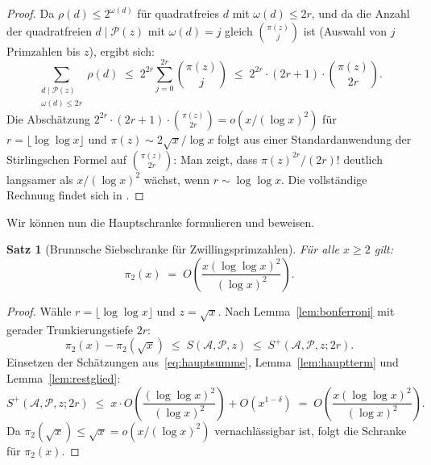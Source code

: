 \documentclass[12pt,a4paper]{amsart}
\newtheorem{theorem}{Satz}[section]
\theoremstyle{definition}
\begin{document}
\begin{proof}
  Da $\rho(d) \leq 2^{\omega(d)}$ für quadratfreies $d$ mit $\omega(d) \leq 2r$,
  und da die Anzahl der quadratfreien $d \mid \mathcal{P}(z)$ mit $\omega(d) = j$
  gleich $\binom{\pi(z)}{j}$ ist (Auswahl von $j$ Primzahlen bis $z$), ergibt sich:
  \[
    \sum_{\substack{d \mid \mathcal{P}(z)\\ \omega(d)\leq 2r}} \rho(d)
    \;\leq\; 2^{2r} \sum_{j=0}^{2r} \binom{\pi(z)}{j}
    \;\leq\; 2^{2r} \cdot (2r+1) \cdot \binom{\pi(z)}{2r}.
  \]
  Die Abschätzung $2^{2r}\cdot(2r+1)\cdot\binom{\pi(z)}{2r} = o\!\left(x/(\log x)^2\right)$
  für $r = \lfloor\log\log x\rfloor$ und $\pi(z) \sim 2\sqrt{x}/\log x$ folgt aus
  einer Standardanwendung der Stirlingschen Formel auf $\binom{\pi(z)}{2r}$:
  Man zeigt, dass $\pi(z)^{2r}/(2r)!$ deutlich langsamer als $x/(\log x)^2$
  wächst, wenn $r \sim \log\log x$.  Die vollständige Rechnung findet sich in
  \cite[§2.4]{CojocMurty}.
\end{proof}

Wir können nun die Hauptschranke formulieren und beweisen.

\begin{theorem}[Brunnsche Siebschranke für Zwillingsprimzahlen]\label{thm:siebschranke}
  Für alle $x \geq 2$ gilt:
  \[
    \pi_2(x) \;=\; O\!\left(\frac{x(\log\log x)^2}{(\log x)^2}\right).
  \]
\end{theorem}

\begin{proof}
  Wähle $r = \lfloor\log\log x\rfloor$ und $z = \sqrt{x}$.  Nach
  Lemma~\ref{lem:bonferroni} mit gerader Trunkierungstiefe $2r$:
  \[
    \pi_2(x) - \pi_2(\sqrt{x})
    \;\leq\; S(\mathcal{A}, \mathcal{P}, z)
    \;\leq\; S^+(\mathcal{A}, \mathcal{P}, z; 2r).
  \]
  Einsetzen der Schätzungen aus~\eqref{eq:hauptsumme}, Lemma~\ref{lem:hauptterm}
  und Lemma~\ref{lem:restglied}:
  \[
    S^+(\mathcal{A}, \mathcal{P}, z; 2r)
    \;\leq\; x \cdot O\!\left(\frac{(\log\log x)^2}{(\log x)^2}\right)
             + O(x^{1-\delta})
    \;=\; O\!\left(\frac{x(\log\log x)^2}{(\log x)^2}\right).
  \]
  Da $\pi_2(\sqrt{x}) \leq \sqrt{x} = o(x/(\log x)^2)$ vernachlässigbar ist,
  folgt die Schranke für $\pi_2(x)$.
\end{proof}
\end{document}
